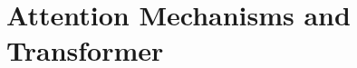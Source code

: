 \setcounter{chapter}{14}

\hypertarget{attention-mechanisms-and-transformer}{%
\chapter{Attention Mechanisms and Transformer}\label{attention-mechanisms-and-transformer}}
